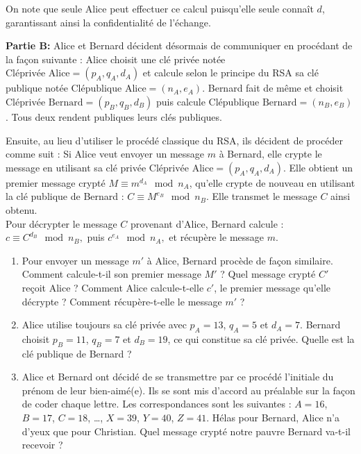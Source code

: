 {{\begin{enumerate}
    On note que seule Alice peut effectuer ce calcul puisqu'elle seule connaît \(d\), garantissant ainsi la confidentialité de l'échange.
\end{enumerate}
{\bf{Partie B:}}
Alice et Bernard décident désormais de communiquer en procédant de la façon suivante :  
Alice choisit une clé privée notée \(\text{Cléprivée Alice} = (p_A, q_A, d_A)\) et calcule selon le principe du RSA sa clé publique notée \(\text{Clépublique Alice} = (n_A, e_A)\). Bernard fait de même et choisit \(\text{Cléprivée Bernard} = (p_B, q_B, d_B)\) puis calcule \(\text{Clépublique Bernard} = (n_B, e_B)\). Tous deux rendent publiques leurs clés publiques.


Ensuite, au lieu d’utiliser le procédé classique du RSA, ils décident de procéder comme suit :  
Si Alice veut envoyer un message \(m\) à Bernard, elle crypte le message en utilisant sa clé privée \(\text{Cléprivée Alice} = (p_A, q_A, d_A)\). Elle obtient un premier message crypté \(M \equiv m^{d_A} \mod n_A\), qu’elle crypte de nouveau en utilisant la clé publique de Bernard : \(C \equiv M^{e_B} \mod n_B\). Elle transmet le message \(C\) ainsi obtenu.\\
Pour décrypter le message \(C\) provenant d’Alice, Bernard calcule :
$c \equiv C^{d_B} \mod n_B,$ puis $c^{e_A} \mod n_A,$ et récupère le message \(m\).


\begin{enumerate}
    \item Pour envoyer un message \(m'\) à Alice, Bernard procède de façon similaire. Comment calcule-t-il son premier message \(M'\) ? Quel message crypté \(C'\) reçoit Alice ? Comment Alice calcule-t-elle \(c'\), le premier message qu'elle décrypte ? Comment récupère-t-elle le message \(m'\) ?
    
    \item Alice utilise toujours sa clé privée avec \(p_A = 13\), \(q_A = 5\) et \(d_A = 7\). Bernard choisit \(p_B = 11\), \(q_B = 7\) et \(d_B = 19\), ce qui constitue sa clé privée. Quelle est la clé publique de Bernard ?
    
    \item Alice et Bernard ont décidé de se transmettre par ce procédé l'initiale du prénom de leur bien-aimé(e). Ils se sont mis d’accord au préalable sur la façon de coder chaque lettre. Les correspondances sont les suivantes :  
    \(A = 16\), \(B = 17\), \(C = 18\), \dots, \(X = 39\), \(Y = 40\), \(Z = 41\).  
    Hélas pour Bernard, Alice n’a d’yeux que pour Christian. Quel message crypté notre pauvre Bernard va-t-il recevoir ?
    

\end{enumerate}}}
